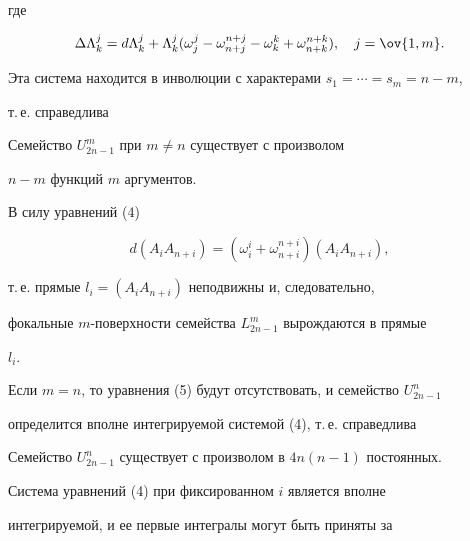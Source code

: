 где 


$$ 


\Delta\Lambda^j_k=d\Lambda^j_k+\Lambda^j_k 


(\omega^j_j-\omega^{n+j}_{n+j}- 


\omega^k_k+\omega^{n+k}_{n+k}),\quad j=\ov{1,m}. 


$$ 


Эта система находится в инволюции с характерами $s_1=\dotsb=s_m=n-m$, 


т.\,е. справедлива 


 


\begin{thm} 


Семейство $U^m_{2n-1}$ при $m\ne n$ существует с произволом 


$n-m$ функций $m$ аргументов. 


\end{thm} 


 


В силу уравнений (4) 


$$ 


d(A_i A_{n+i})=(\omega^i_i+\omega^{n+i}_{n+i})(A_i A_{n+i}), 


$$ 


т.\,е. прямые $l_i=(A_i A_{n+i})$ неподвижны и, следовательно, 


фокальные $m$-поверхности семейства $L^m_{2n-1}$ вырождаются в прямые 


$l_i$. 


 


Если $m=n$, то уравнения (5) будут отсутствовать, и семейство $U^n_{2n-1}$ 


определится вполне интегрируемой системой (4), т.\,е. справедлива 


 


\begin{thm} 


Семейство $U^n_{2n-1}$ существует с произволом в $4n(n-1)$ постоянных. 


\end{thm} 


 


Система уравнений (4) при фиксированном $i$ является вполне 


интегрируемой, и ее первые интегралы могут быть приняты за 


